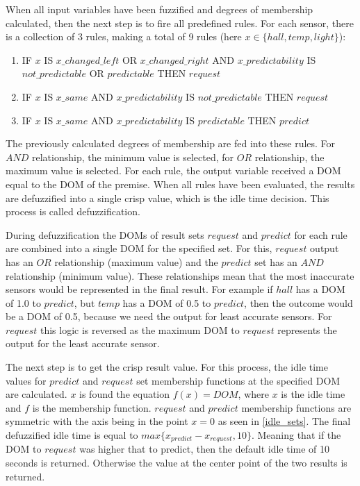 When all input variables have been fuzzified and degrees of membership calculated, then the next step is to fire all predefined rules. For each sensor, there is a collection of 3 rules, making a total of 9 rules (here $x \in \{hall, temp, light\}$):

\begin{enumerate}
\item IF $x$ IS $x\_changed\_left$ OR $x\_changed\_right$ AND $x\_predictability$ IS $not\_predictable$ OR $predictable$ THEN $request$
\item IF $x$ IS $x\_same$ AND $x\_predictability$ IS $not\_predictable$ THEN $request$
\item IF $x$ IS $x\_same$ AND $x\_predictability$ IS $predictable$ THEN $predict$
\end{enumerate}

The previously calculated degrees of membership are fed into these rules. For $AND$ relationship, the minimum value is selected, for $OR$ relationship, the maximum value is selected. For each rule, the output variable received a DOM equal to the DOM of the premise. When all rules have been evaluated, the results are defuzzified into a single crisp value, which is the idle time decision. This process is called defuzzification.

During defuzzification the DOMs of result sets $request$ and $predict$ for each rule are combined into a single DOM for the specified set. For this, $request$ output has an $OR$ relationship (maximum value) and the $predict$ set has an $AND$ relationship (minimum value). These relationships mean that the most inaccurate sensors would be represented in the final result. For example if $hall$ has a DOM of 1.0 to $predict$, but $temp$ has a DOM of 0.5 to $predict$, then the outcome would be a DOM of 0.5, because we need the output for least accurate sensors. For $request$ this logic is reversed as the maximum DOM to $request$ represents the output for the least accurate sensor. 

The next step is to get the crisp result value. For this process, the idle time values for $predict$ and $request$ set membership functions at the specified DOM are calculated. $x$ is found the equation $f(x) = DOM$, where $x$ is the idle time and $f$ is the membership function. $request$ and $predict$ membership functions are symmetric with the axis being in the point $x = 0$ as seen in \autoref{idle_sets}. The final defuzzified idle time is equal to $max\{x_{predict} - x_{request}, 10\}$. Meaning that if the DOM to $request$ was higher that to predict, then the default idle time of 10 seconds is returned. Otherwise the value at the center point of the two results is returned.

